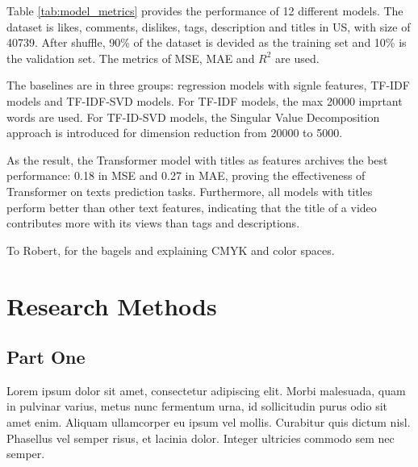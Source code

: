 \documentclass[sigplan,screen]{acmart}
\begin{document}
Table \ref{tab:model_metrics} provides the performance of 12 different models. The dataset is likes, comments, dislikes, tags, description and titles in US, with size of 40739. After shuffle, 90\% of the dataset is devided as the training set and 10\% is the validation set. The metrics of MSE, MAE and $R^2$ are used.

The baselines are in three groups: regression models with signle features, TF-IDF models and TF-IDF-SVD models. For TF-IDF models, the max 20000 imprtant words are used. For TF-ID-SVD models, the Singular Value Decomposition approach is introduced for dimension reduction from 20000 to 5000.

As the result, the Transformer model with titles as features archives the best performance: 0.18 in MSE and 0.27 in MAE, proving the effectiveness of Transformer on texts prediction tasks. Furthermore, all models with titles perform better than other text features, indicating that the title of a video contributes more with its views than tags and descriptions.




\begin{acks}
To Robert, for the bagels and explaining CMYK and color spaces.
\end{acks}





\appendix

\section{Research Methods}

\subsection{Part One}

Lorem ipsum dolor sit amet, consectetur adipiscing elit. Morbi
malesuada, quam in pulvinar varius, metus nunc fermentum urna, id
sollicitudin purus odio sit amet enim. Aliquam ullamcorper eu ipsum
vel mollis. Curabitur quis dictum nisl. Phasellus vel semper risus, et
lacinia dolor. Integer ultricies commodo sem nec semper.
\end{document}
